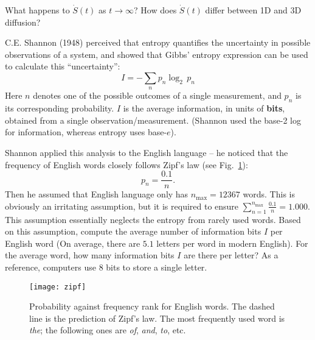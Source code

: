 \smallskip \subp
What happens to $\dot S(t)$ as $t \to \infty$?
How does $\dot S(t)$ differ between 1D and 3D diffusion?

\bigskip
{}
C.E. Shannon (1948) perceived that entropy quantifies
the uncertainty in possible observations of a system,
and showed that Gibbs' entropy expression can be used to
calculate this ``uncertainty'':
\[ I = - \sum_n p_n \log_2\, p_n \]
Here $n$ denotes one of the possible outcomes of a single measurement,
and $p_n$ is its corresponding probability.
$I$ is the average information, in units of {\bf bits},
obtained from a single observation/measurement. 
(Shannon used the base-2 log for information, whereas entropy uses base-$e$).
\iffalse
For the two-state model we studied in class,
using the above notation, we may say that at $T = +\infty$,
the information collected after measuring the energetic state of a single particle is
$$I(\text{two state}; T=+\infty) = -\frac{1}{2}\log_2\left(\frac{1}{2}\right)
- \frac{1}{2}\log_2\left(\frac{1}{2}\right) = 1 \,\text{bit},$$
as the particle sits in any of the two states with probability $1/2$.
At zero temperature ($T=+0$), measuring the state of particles provides 0\,bit of information,
since we know with certainty before any measurement that the
particles are all seated in the low-energy state (the third law). \\
\fi
Shannon applied this analysis to the English language -- 
he noticed that the frequency of English words closely follows Zipf's law
(see Fig.~\ref{fig:zipf}):
$$ p_n = \frac{0.1}{n} .$$
Then he assumed that English language only has $n_\text{max} = 12367$ words.
This is obviously an irritating assumption, but it is required to ensure
$\sum_{n=1}^{n_\text{max}} \frac{0.1}{n} = 1.000$.
This assumption essentially neglects the entropy from rarely used words.
Based on this assumption, compute the average number of 
information bits $I$ per English word
(On average, there are $5.1$ letters per word in modern English).
For the average word, how many information bits $I$ are there per letter? 
As a reference, computers use 8 bits to store a single letter.

\begin{figure}[h]\centering
\texttt{[image: zipf]}
\caption{\label{fig:zipf}
Probability against frequency rank for English words.
The dashed line is the prediction of Zipf's law.
The most frequently used word is {\sl the};
the following ones are {\sl of}, {\sl and}, {\sl to}, etc.
}
\end{figure}

